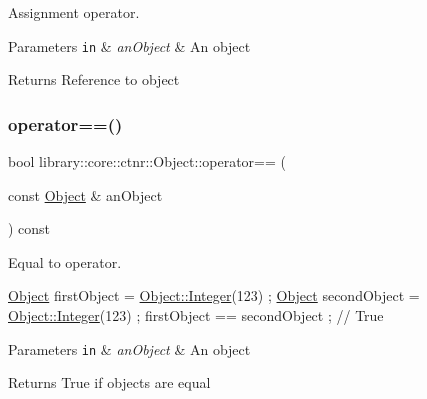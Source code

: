 Assignment operator. 


\begin{DoxyParams}[1]{Parameters}
\mbox{\tt in}  & {\em an\+Object} & An object \\
\hline
\end{DoxyParams}
\begin{DoxyReturn}{Returns}
Reference to object 
\end{DoxyReturn}
\mbox{\label{classlibrary_1_1core_1_1ctnr_1_1_object_a543801cb9c7c22432603aca5435595e9}} 
\subsubsection{\texorpdfstring{operator==()}{operator==()}}
{\footnotesize\ttfamily bool library\+::core\+::ctnr\+::\+Object\+::operator== (\begin{DoxyParamCaption}\item[{const \hyperlink{classlibrary_1_1core_1_1ctnr_1_1_object}{Object} \&}]{an\+Object }\end{DoxyParamCaption}) const}



Equal to operator. 


\begin{DoxyCode}
\hyperlink{classlibrary_1_1core_1_1ctnr_1_1_object_a51bb72dec3a1b2738e0ad92b977b8d8d}{Object} firstObject = \hyperlink{classlibrary_1_1core_1_1ctnr_1_1_object_a6746a69f0507b2c7ad8ebdf3d873b083}{Object::Integer}(123) ;
\hyperlink{classlibrary_1_1core_1_1ctnr_1_1_object_a51bb72dec3a1b2738e0ad92b977b8d8d}{Object} secondObject = \hyperlink{classlibrary_1_1core_1_1ctnr_1_1_object_a6746a69f0507b2c7ad8ebdf3d873b083}{Object::Integer}(123) ;
firstObject == secondObject ; \textcolor{comment}{// True}
\end{DoxyCode}



\begin{DoxyParams}[1]{Parameters}
\mbox{\tt in}  & {\em an\+Object} & An object \\
\hline
\end{DoxyParams}
\begin{DoxyReturn}{Returns}
True if objects are equal 
\end{DoxyReturn}
\mbox{\label{classlibrary_1_1core_1_1ctnr_1_1_object_ad5b78e31dbe7d2cfddb14240b573862b}} 
